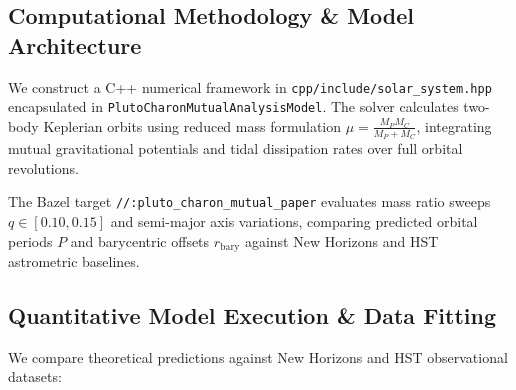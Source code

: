 \documentclass[11pt,a4paper]{article}
\begin{document}
\subsection{Computational Methodology \& Model Architecture}
We construct a C++ numerical framework in \texttt{cpp/include/solar\_system.hpp} encapsulated in \texttt{PlutoCharonMutualAnalysisModel}. The solver calculates two-body Keplerian orbits using reduced mass formulation $\mu = \frac{M_P M_C}{M_P + M_C}$, integrating mutual gravitational potentials and tidal dissipation rates over full orbital revolutions.

The Bazel target \texttt{//:pluto\_charon\_mutual\_paper} evaluates mass ratio sweeps $q \in [0.10, 0.15]$ and semi-major axis variations, comparing predicted orbital periods $P$ and barycentric offsets $r_{\text{bary}}$ against New Horizons and HST astrometric baselines.

\subsection{Quantitative Model Execution \& Data Fitting}
We compare theoretical predictions against New Horizons and HST observational datasets:

\begin{table}[H]
\centering
\caption{\textbf{Quantitative Comparison: New Horizons Observations vs. Binary Physics Model}}
\end{table}
\end{document}
